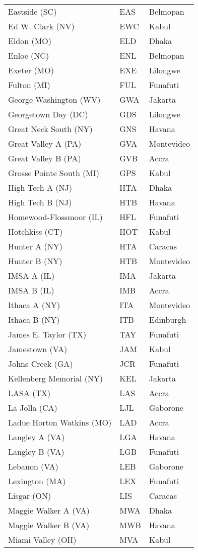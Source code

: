 \documentclass{article}%
\begin{document}
\begin{longtable}{|ll|l|}
Eastside (SC)&EAS&Belmopan\\%
Ed W. Clark (NV)&EWC&Kabul\\%
Eldon (MO)&ELD&Dhaka\\%
Enloe (NC)&ENL&Belmopan\\%
Exeter (MO)&EXE&Lilongwe\\%
Fulton (MI)&FUL&Funafuti\\%
George Washington (WV)&GWA&Jakarta\\%
Georgetown Day (DC)&GDS&Lilongwe\\%
Great Neck South (NY)&GNS&Havana\\%
Great Valley A (PA)&GVA&Montevideo\\%
Great Valley B (PA)&GVB&Accra\\%
Grosse Pointe South (MI)&GPS&Kabul\\%
High Tech A (NJ)&HTA&Dhaka\\%
High Tech B (NJ)&HTB&Havana\\%
Homewood{-}Flossmoor (IL)&HFL&Funafuti\\%
Hotchkiss (CT)&HOT&Kabul\\%
Hunter A (NY)&HTA&Caracas\\%
Hunter B (NY)&HTB&Montevideo\\%
IMSA A (IL)&IMA&Jakarta\\%
IMSA B (IL)&IMB&Accra\\%
Ithaca A (NY)&ITA&Montevideo\\%
Ithaca B (NY)&ITB&Edinburgh\\%
James E. Taylor (TX)&TAY&Funafuti\\%
Jamestown (VA)&JAM&Kabul\\%
Johns Creek (GA)&JCR&Funafuti\\%
Kellenberg Memorial (NY)&KEL&Jakarta\\%
LASA (TX)&LAS&Accra\\%
La Jolla (CA)&LJL&Gaborone\\%
Ladue Horton Watkins (MO)&LAD&Accra\\%
Langley A (VA)&LGA&Havana\\%
Langley B (VA)&LGB&Funafuti\\%
Lebanon (VA)&LEB&Gaborone\\%
Lexington (MA)&LEX&Funafuti\\%
Lisgar (ON)&LIS&Caracas\\%
Maggie Walker A (VA)&MWA&Dhaka\\%
Maggie Walker B (VA)&MWB&Havana\\%
Miami Valley (OH)&MVA&Kabul\\%

\end{longtable}
\end{document}
